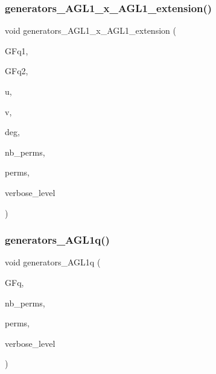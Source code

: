 \subsubsection{\texorpdfstring{generators\+\_\+\+A\+G\+L1\+\_\+x\+\_\+\+A\+G\+L1\+\_\+extension()}{generators\_AGL1\_x\_AGL1\_extension()}}
{\footnotesize\ttfamily void generators\+\_\+\+A\+G\+L1\+\_\+x\+\_\+\+A\+G\+L1\+\_\+extension (\begin{DoxyParamCaption}\item[{\mbox{\hyperlink{classfinite__field}{finite\+\_\+field}} \&}]{G\+Fq1,  }\item[{\mbox{\hyperlink{classfinite__field}{finite\+\_\+field}} \&}]{G\+Fq2,  }\item[{\mbox{\hyperlink{galois_8h_a09fddde158a3a20bd2dcadb609de11dc}{I\+NT}}}]{u,  }\item[{\mbox{\hyperlink{galois_8h_a09fddde158a3a20bd2dcadb609de11dc}{I\+NT}}}]{v,  }\item[{\mbox{\hyperlink{galois_8h_a09fddde158a3a20bd2dcadb609de11dc}{I\+NT}} \&}]{deg,  }\item[{\mbox{\hyperlink{galois_8h_a09fddde158a3a20bd2dcadb609de11dc}{I\+NT}} \&}]{nb\+\_\+perms,  }\item[{\mbox{\hyperlink{galois_8h_a09fddde158a3a20bd2dcadb609de11dc}{I\+NT}} $\ast$\&}]{perms,  }\item[{\mbox{\hyperlink{galois_8h_a09fddde158a3a20bd2dcadb609de11dc}{I\+NT}}}]{verbose\+\_\+level }\end{DoxyParamCaption})}

\mbox{\label{group__generators_8_c_afc7c7c132fbdf09a3cf393f6b0221d04}} 
\subsubsection{\texorpdfstring{generators\+\_\+\+A\+G\+L1q()}{generators\_AGL1q()}}
{\footnotesize\ttfamily void generators\+\_\+\+A\+G\+L1q (\begin{DoxyParamCaption}\item[{\mbox{\hyperlink{classfinite__field}{finite\+\_\+field}} \&}]{G\+Fq,  }\item[{\mbox{\hyperlink{galois_8h_a09fddde158a3a20bd2dcadb609de11dc}{I\+NT}} \&}]{nb\+\_\+perms,  }\item[{\mbox{\hyperlink{galois_8h_a09fddde158a3a20bd2dcadb609de11dc}{I\+NT}} $\ast$\&}]{perms,  }\item[{\mbox{\hyperlink{galois_8h_a09fddde158a3a20bd2dcadb609de11dc}{I\+NT}}}]{verbose\+\_\+level }\end{DoxyParamCaption})}

